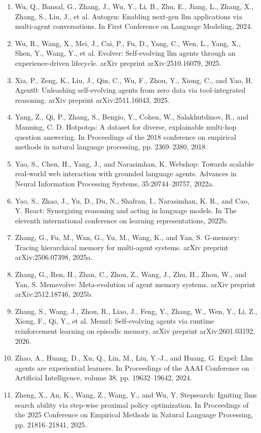 \documentclass[11pt,UTF8,fontset=fandol]{ctexart}
\begin{document}
\begin{enumerate}[leftmargin=2em,itemsep=0.15em]
\item Wu, Q., Bansal, G., Zhang, J., Wu, Y., Li, B., Zhu, E., Jiang, L., Zhang, X., Zhang, S., Liu, J., et al. Autogen: Enabling next-gen llm applications via multi-agent conversations. In First Conference on Language Modeling, 2024.
\item Wu, R., Wang, X., Mei, J., Cai, P., Fu, D., Yang, C., Wen, L., Yang, X., Shen, Y., Wang, Y., et al. Evolver: Self-evolving llm agents through an experience-driven lifecycle. arXiv preprint arXiv:2510.16079, 2025.
\item Xia, P., Zeng, K., Liu, J., Qin, C., Wu, F., Zhou, Y., Xiong, C., and Yao, H. Agent0: Unleashing self-evolving agents from zero data via tool-integrated reasoning. arXiv preprint arXiv:2511.16043, 2025.
\item Yang, Z., Qi, P., Zhang, S., Bengio, Y., Cohen, W., Salakhutdinov, R., and Manning, C. D. Hotpotqa: A dataset for diverse, explainable multi-hop question answering. In Proceedings of the 2018 conference on empirical methods in natural language processing, pp. 2369--2380, 2018.
\item Yao, S., Chen, H., Yang, J., and Narasimhan, K. Webshop: Towards scalable real-world web interaction with grounded language agents. Advances in Neural Information Processing Systems, 35:20744--20757, 2022a.
\item Yao, S., Zhao, J., Yu, D., Du, N., Shafran, I., Narasimhan, K. R., and Cao, Y. React: Synergizing reasoning and acting in language models. In The eleventh international conference on learning representations, 2022b.
\item Zhang, G., Fu, M., Wan, G., Yu, M., Wang, K., and Yan, S. G-memory: Tracing hierarchical memory for multi-agent systems. arXiv preprint arXiv:2506.07398, 2025a.
\item Zhang, G., Ren, H., Zhan, C., Zhou, Z., Wang, J., Zhu, H., Zhou, W., and Yan, S. Memevolve: Meta-evolution of agent memory systems. arXiv preprint arXiv:2512.18746, 2025b.
\item Zhang, S., Wang, J., Zhou, R., Liao, J., Feng, Y., Zhang, W., Wen, Y., Li, Z., Xiong, F., Qi, Y., et al. Memrl: Self-evolving agents via runtime reinforcement learning on episodic memory. arXiv preprint arXiv:2601.03192, 2026.
\item Zhao, A., Huang, D., Xu, Q., Lin, M., Liu, Y.-J., and Huang, G. Expel: Llm agents are experiential learners. In Proceedings of the AAAI Conference on Artificial Intelligence, volume 38, pp. 19632--19642, 2024.
\item Zheng, X., An, K., Wang, Z., Wang, Y., and Wu, Y. Stepsearch: Igniting llms search ability via step-wise proximal policy optimization. In Proceedings of the 2025 Conference on Empirical Methods in Natural Language Processing, pp. 21816--21841, 2025.
\end{enumerate}
\end{document}
